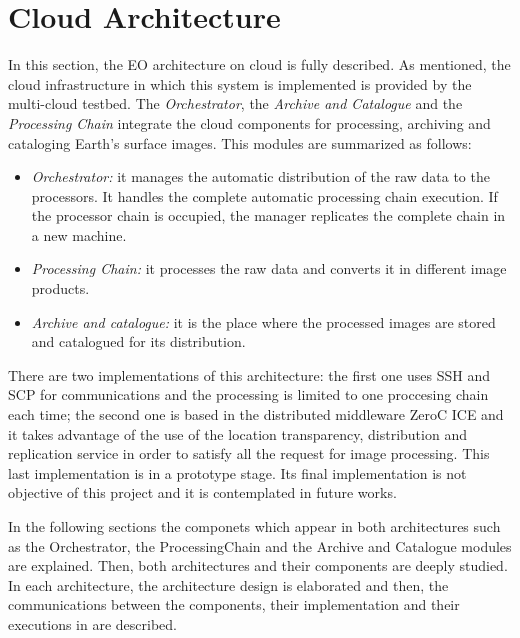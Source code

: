 \section{Cloud Architecture}

In this section, the \ac{EO} architecture on cloud is fully described. As
mentioned, the cloud infrastructure in which this system is implemented is provided
by the \bonfire multi-cloud testbed. The \emph{Orchestrator}, the \emph{Archive and
  Catalogue} and the \emph{Processing
Chain} integrate the cloud components for processing, archiving and cataloging
Earth's surface images. This modules are summarized as follows:
\begin{itemize}
\item \emph{Orchestrator:} it manages the automatic distribution of the raw data to the processors. It handles the complete automatic processing chain execution.  If the processor chain is occupied, the manager replicates the complete chain in a new machine.
\item \emph{Processing Chain:} it processes the raw data and converts it in
  different image products. 
\item \emph{Archive and catalogue:} it is the place where the processed images are stored and catalogued for its distribution.
\end{itemize}


There are two implementations of this architecture: the first one uses \ac{SSH}
and \ac{SCP} for communications and the processing is limited to one proccesing chain each time; the second one is based in the distributed middleware
ZeroC ICE and it takes advantage of the use of the location transparency,
distribution and replication service in order to satisfy all the request for
image processing. This last implementation is in a prototype stage. Its final
implementation is not objective of this project and it is contemplated in future
works.


In the following sections the
componets which appear in both architectures such as the Orchestrator,
the ProcessingChain and the Archive and Catalogue modules are explained. Then, both
architectures and their components are deeply studied. In each architecture, the architecture design is elaborated and then, the communications
between the components, their implementation and their executions in \bonfire are described.





